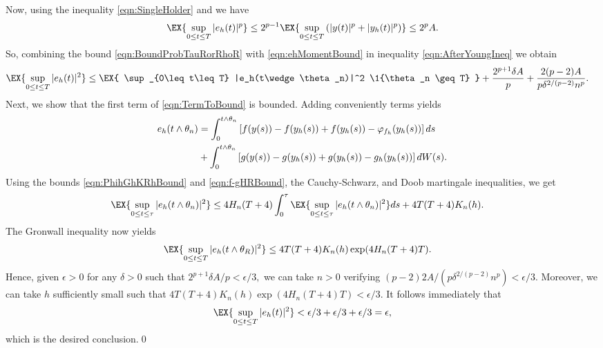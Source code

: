 \documentclass[sort&compress, preprint]{elsarticle}
\theoremstyle{definition}
\theoremstyle{plain}%
\theoremstyle{remark}
\begin{document}
\begin{pf}
	Now, using the inequality \eqref{eqn:SingleHolder} and  we have
	\begin{equation} \label{eqn:ehMomentBound}
		\EX{
			\sup_{0\leq t \leq T}
			|e_h(t)|^p
		}
		\leq
		2^{p-1}
		\EX{
			\sup_{0 \leq t \leq T}
			\left(
			|y(t)|^p + |y_h(t)|^p
			\right)
		}
		\leq 2^pA.
	\end{equation}
%
	So, combining the bound \eqref{eqn:BoundProbTauRorRhoR} with \eqref{eqn:ehMomentBound}
	in inequality \eqref{eqn:AfterYoungIneq} we obtain
	\begin{align}
		\EX{
			\sup_{0\leq t \leq T}
			|e_h(t)|^2
		}
		&\leq
			\EX{
				\sup_{0\leq t\leq T}
				|e_h(t\wedge \theta_n)|^2
				\1{\theta_n \geq T}
			}
			+\frac{2^{p+1}\delta A}{p}
			+\frac{2(p-2)A}{p\delta^{2/(p-2)}n^p}. \label{eqn:TermToBound}
	\end{align}
	Next, we show that the first term of \eqref{eqn:TermToBound} is bounded. Adding conveniently terms yields
	\begin{align*}
		e_h(t\wedge\theta_n) 
			&=
			\int_{0}^{t\wedge\theta_n}
			\left[
				f(y(s)) - f(y_h(s))+f(y_h(s))
				-\varphi_{f_h}(y_h(s))
			\right]ds \notag \\
			&+
			\int_{0}^{t\wedge\theta_n}
			\left[
				g(y(s)) - g(y_h(s))+g(y_h(s))
				-g_h(y_h(s))
			\right]dW(s).
	\end{align*}
	Using the bounds \eqref{eqn:PhihGhKRhBound} and \eqref{eqn:f-gHRBound}, the Cauchy-Schwarz, and
	Doob martingale inequalities, we get
	\begin{align*}
		\EX{\sup_{0\leq t \leq \tau}|e_h(t\wedge\theta_n)|^2}
		&\leq 
		4H_n(T+4)
		\int_{0}^{\tau}
			\EX{\sup_{0\leq t \leq \tau}|e_h(t\wedge\theta_n)|^2} ds 
		+
		4T(T+4)K_n(h).\notag
	\end{align*}
	The Gronwall inequality now yields
	\begin{align*}
		\EX{\sup_{0\leq t \leq T}|e_h(t\wedge\theta_R)|^2}
		&\leq
			4T(T+4)K_n(h)\exp(4H_n(T+4)T). %
	\end{align*}
	Hence, given $\epsilon>0$ for any $\delta>0$ such that
	$
		2^{p+1}\delta A/p< \epsilon/3,
	$
		we can take $n>0$ verifying
	$
		(p-2)2A/(p\delta^{2/(p-2)}n^p)<\epsilon/3.
	$
	Moreover, we can take $h$ sufficiently small such that
	$
		4T(T+4)K_n(h)\exp(4H_n(T+4)T) < \epsilon/3. 
	$
	It follows immediately that
	$$
		\EX{\sup_{0\leq t \leq T}|e_h(t)|^2}
		<
			\epsilon/3
			+\epsilon/3
			+\epsilon/3
		=\epsilon,
	$$ which is the desired conclusion.\qed
\end{pf}
\end{document}

